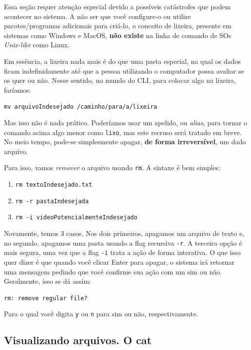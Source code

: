 \documentclass{article}
\begin{document}
	Essa seção requer atenção especial devido a possíveis catástrofes que podem acontecer no sistema. A não ser que você 
	configure-o ou utilize pacotes/programas adicionais para criá-lo, o conceito de lixeira, presente em sistemas
	como Windows e MacOS, \textbf{não existe} na linha de comando de SOs \textit{Unix-like} como Linux. 


	Em essência, a lixeira nada mais é do que uma pasta especial, na qual os dados ficam indefinidamente até que a pessoa
	utilizando o computador possa avaliar se os quer ou não. Nesse sentido, no mundo do CLI, para colocar algo na lixeira,
	faríamos: 
	
	\vspace{1ex} 
	\texttt{mv arquivoIndesejado /caminho/para/a/lixeira} 
	\vspace{1ex} 

	Mas isso não é nada prático. Poderíamos usar um apelido, ou \textit{alias}, para tornar o comando acima algo menor 
	como \texttt{lixo}, mas este recruso será tratado em breve. No meio tempo, pode-se simplesmente apagar,
	\textbf{de forma irreversível}, um dado arquivo. 

	Para isso, vamos \textit{remover} o arquivo usando \texttt{rm}. A sintaxe é bem simples: 
	\begin{enumerate} 
		\item{\texttt{rm textoIndesejado.txt}} 
		\item{\texttt{rm -r pastaIndesejada}} 
		\item{\texttt{rm -i videoPotencialmenteIndesejado}} 
	\end{enumerate}

	Novamente, temos 3 casos. Nos dois primeiros, apagamos um arquivo de texto e, no segundo, apagamos uma pasta usando 
	a flag recursiva \texttt{-r}. A terceira opção é mais segura, uma vez que a flag \texttt{-i} trata a ação de forma
	interativa. O que isso quer dizer é que quando você clicar Enter para apagar, o sistema irá retornar uma mensagem 
	pedindo que você confirme sua ação com um sim ou não. Geralmente, isso se dá assim:
	
	\vspace{1ex}
	\texttt{rm: remove regular file?} 
	\vspace{1ex} 
	
	Para o qual você digita \texttt{y} ou \texttt{n} para sim ou não, respectivamente. 

	\subsection{Visualizando arquivos. O cat} 
\end{document}
